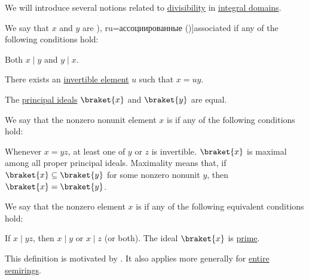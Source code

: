 \begin{definition}\label{def:domain_divisibility}
  We will introduce several notions related to \hyperref[def:divisibility]{divisibility} in \hyperref[def:integral_domain]{integral domains}.

  \begin{thmenum}
     We say that \( x \) and \( y \) are \term[bg=асоциирани (\cite[142]{ГеновМиховскиМоллов1991}), ru=ассоциированные (\cite[118]{Винберг2014})]{associated} if any of the following conditions hold:
    \begin{thmenum}
       Both \( x \mid y \) and \( y \mid x \).

       There exists an \hyperref[def:divisibility/invertible]{invertible element} \( u \) such that \( x = uy \).

       The \hyperref[def:semiring_ideal/principal]{principal ideals} \( \braket{ x } \) and \( \braket{ y } \) are equal.
    \end{thmenum}

     We say that the nonzero nonunit element \( x \) is  if any of the following conditions hold:
    \begin{thmenum}
       Whenever \( x = yz \), at least one of \( y \) or \( z \) is invertible.
       \( \braket{ x } \) is maximal among all proper principal ideals. Maximality means that, if \( \braket{ x } \subseteq \braket{ y } \) for some nonzero nonunit \( y \), then \( \braket{ x } = \braket{ y } \).
    \end{thmenum}

     We say that the nonzero element \( x \) is  if any of the following equivalent conditions hold:
    \begin{thmenum}
       If \( x \mid yz \), then \( x \mid y \) or \( x \mid z \) (or both).
       The ideal \( \braket{ x } \) is \hyperref[def:semiring_ideal/prime]{prime}.
    \end{thmenum}

    This definition is motivated by . It also applies more generally for \hyperref[def:entire_semiring]{entire semirings}.
  \end{thmenum}
\end{definition}
